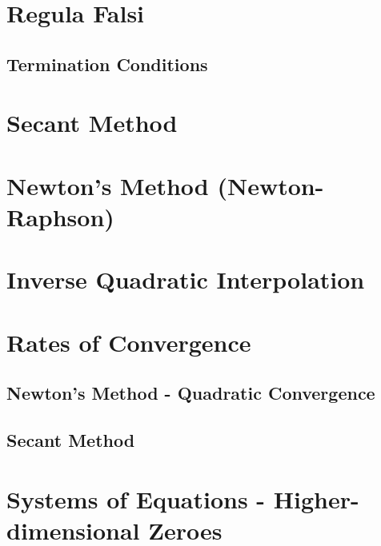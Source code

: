     \begin{figure}
      \centering
      
      \label{fig:bisection_example}
    \end{figure}

    
    \section{Regula Falsi}
    \begin{figure}
      \centering
      
    \end{figure}
    \begin{figure}
      \centering
      
    \end{figure}
    \begin{figure}
      \centering
      
    \end{figure}
    
    \subsection{Termination Conditions}
    
    \section{Secant Method}
    
    \section{Newton's Method (Newton-Raphson)}
    
    \section{Inverse Quadratic Interpolation}
    
    \section{Rates of Convergence}
    
    \subsection{Newton's Method - Quadratic Convergence}
    
    \subsection{Secant Method}
    
    \section{Systems of Equations - Higher-dimensional Zeroes}
